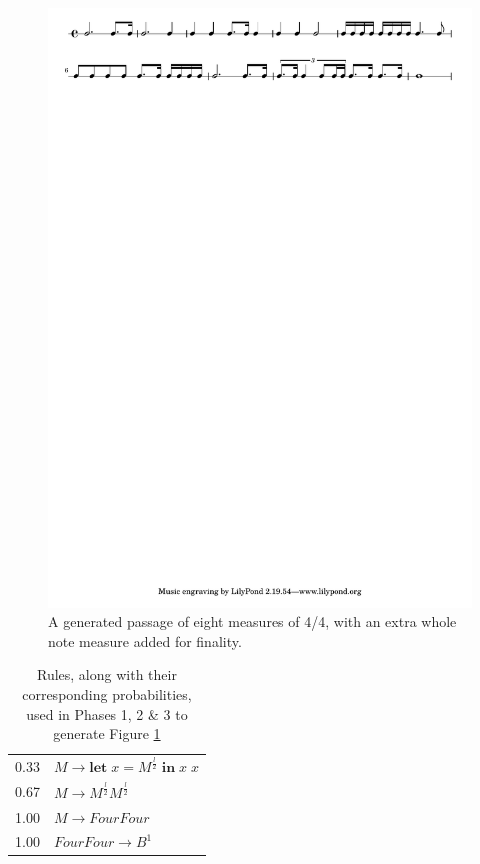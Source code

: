 \documentclass{article}
\begin{document}
\begin{figure}[t] %
\centering
\includegraphics[width=16cm]{4_4_new.pdf}
\caption{A generated passage of eight measures of 4/4, with an extra whole note measure added for finality.}\label{example_4_4}
\end{figure}

\begin{table}
\centering
\begin{tabular}{ll}
0.33 & $M \rightarrow \textbf{let} \; x = M^\frac{l}{2} \; \textbf{in} \; x \; x$\\
0.67 & $M \rightarrow M^\frac{l}{2} M^\frac{l}{2}$\\
1.00 & $M \rightarrow FourFour$\\
1.00 & $FourFour \rightarrow B^1$\\
\end{tabular}
\caption{Rules, along with their corresponding probabilities, used in Phases 1, 2 \& 3 to generate Figure \ref{example_4_4}}\label{4_4rules_phases123}
\end{table}
\end{document}
